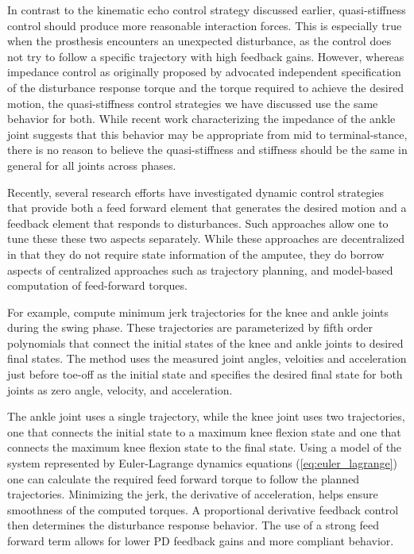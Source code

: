 In contrast to the kinematic echo control strategy discussed earlier,
quasi-stiffness control should produce more reasonable interaction forces. This
is especially true when the prosthesis encounters an unexpected disturbance, as
the control does not try to follow a specific trajectory with high feedback
gains. However, whereas impedance control as originally proposed by
\citet{hogan1985impedance} advocated independent specification of the
disturbance response torque and the torque required to achieve the desired
motion, the quasi-stiffness control strategies we have discussed use the same
behavior for both. While recent work characterizing the impedance of the ankle
joint suggests that this behavior may be appropriate from mid to
terminal-stance, there is no reason to believe the quasi-stiffness and stiffness
should be the same in general for all joints across phases.

Recently, several research efforts have investigated dynamic control strategies
that provide both a feed forward element that generates the desired motion and a
feedback element that responds to disturbances. Such approaches allow one to
tune these these two aspects separately. While these approaches are
decentralized in that they do not require state information of the amputee, they
do borrow aspects of centralized approaches such as trajectory planning, and
model-based computation of feed-forward torques.

For example, \citet{lenzi2014speed, lenzi2014minimum} compute minimum jerk
trajectories for the knee and ankle joints during the swing phase. These
trajectories are parameterized by fifth order polynomials that connect the
initial states of the knee and ankle joints to desired final states. The method
uses the measured joint angles, veloities and acceleration just before toe-off
as the initial state and specifies the desired final state for both joints as
zero angle, velocity, and acceleration.

The ankle joint uses a single trajectory, while the knee joint
uses two trajectories, one that connects the initial state to a maximum knee
flexion state and one that connects the maximum knee flexion state to the final
state.  Using a model of the system represented by Euler-Lagrange dynamics
equations (\cref{eq:euler_lagrange}) one can calculate the required feed forward
torque to follow the planned trajectories. Minimizing the jerk, the derivative
of acceleration, helps ensure smoothness of the computed torques. A proportional
derivative feedback control then determines the disturbance response behavior.
The use of a strong feed forward term allows for lower PD feedback gains and
more compliant behavior.

